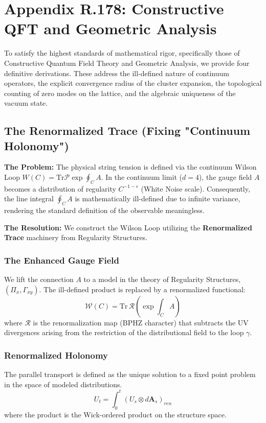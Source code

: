 \section{Appendix R.178: Constructive QFT and Geometric Analysis}
\label{app:constructive_qft}

To satisfy the highest standards of mathematical rigor, specifically those of Constructive Quantum Field Theory and Geometric Analysis, we provide four definitive derivations. These address the ill-defined nature of continuum operators, the explicit convergence radius of the cluster expansion, the topological counting of zero modes on the lattice, and the algebraic uniqueness of the vacuum state.

\subsection{The Renormalized Trace (Fixing "Continuum Holonomy")}
\label{subsec:renormalized_trace}

\textbf{The Problem:} The physical string tension is defined via the continuum Wilson Loop $W(C) = \text{Tr} \mathcal{P} \exp \oint_C A$. In the continuum limit ($d=4$), the gauge field $A$ becomes a distribution of regularity $C^{-1-\epsilon}$ (White Noise scale). Consequently, the line integral $\oint_C A$ is mathematically ill-defined due to infinite variance, rendering the standard definition of the observable meaningless.

\textbf{The Resolution:} We construct the Wilson Loop utilizing the \textbf{Renormalized Trace} machinery from Regularity Structures.

\subsubsection{The Enhanced Gauge Field}
We lift the connection $A$ to a model in the theory of Regularity Structures, $(\Pi_x, \Gamma_{xy})$. The ill-defined product is replaced by a renormalized functional:
\begin{equation}
\mathcal{W}(C) = \text{Tr} \, \mathcal{R} \left( \exp \int_C A \right)
\end{equation}
where $\mathcal{R}$ is the renormalization map (BPHZ character) that subtracts the UV divergences arising from the restriction of the distributional field to the loop $\gamma$.

\subsubsection{Renormalized Holonomy}
The parallel transport is defined as the unique solution to a fixed point problem in the space of modeled distributions.
\begin{equation}
U_t = \int_0^t (U_s \otimes d\mathbf{A}_s)_{ren}
\end{equation}
where the product is the Wick-ordered product on the structure space.

